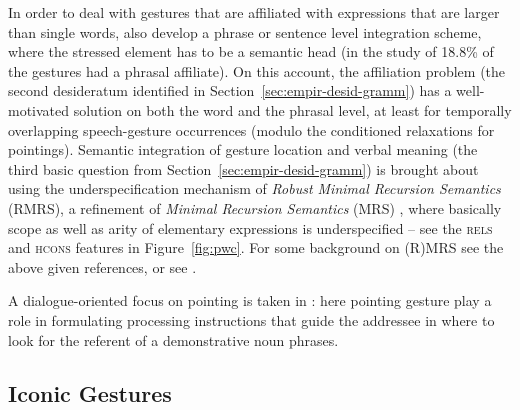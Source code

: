 \documentclass[output=paper]{langsci/langscibook}
\begin{document}
In order to deal with gestures that are affiliated with expressions that are larger than single words, \citet{Alahverdzhieva:Lascarides:Flickinger:2017} also develop a phrase or sentence level integration scheme, where the stressed element has to be a semantic head (in the study of \citet{Mehler:Luecking:2012:d} 18.8\% of the gestures had a phrasal affiliate).
%
On this account, the affiliation problem (the second desideratum identified in Section~\ref{sec:empir-desid-gramm}) has a well-motivated solution on both the word and the phrasal level, at least for temporally overlapping speech-gesture occurrences (modulo the conditioned relaxations for pointings).
%
Semantic integration of gesture location and verbal meaning (the third basic question from Section~\ref{sec:empir-desid-gramm}) is brought about using the underspecification mechanism of \emph{Robust Minimal Recursion Semantics}  (RMRS), a refinement of \emph{Minimal Recursion Semantics}  (MRS) \citep{Copestake:Flickinger:Pollard:Sag:2005}, where basically scope as well as arity of elementary expressions is underspecified \citep{Copestake:2007} -- see the \textsc{rels} and \textsc{hcons} features in Figure~\ref{fig:pwc}.
%
For some background on (R)MRS see the above given references, or see . %


A dialogue-oriented focus on pointing is taken in \citet{Luecking:2018:a}: here pointing gesture play a role in formulating processing instructions that guide the addressee in where to look for the referent of a demonstrative noun phrases. %
 



\subsection{Iconic Gestures}
\label{sec:iconic-gestures}
\end{document}
